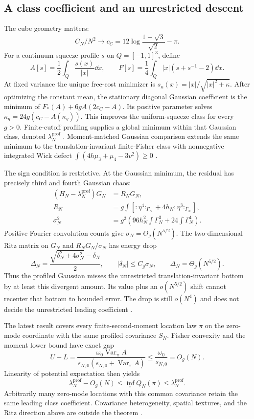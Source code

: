\subsection{A class coefficient and an unrestricted descent}
The cube geometry matters:
\[
 C_N/N^2\longrightarrow c_C=12\log\frac{1+\sqrt3}{\sqrt2}-\pi.
\]
For a continuum squeeze profile $s$ on $Q=[-1,1]^3$, define
\[
 A[s]=\frac12\int_Q\frac{s(x)}{|x|}\dd x,\qquad
 F[s]=\frac14\int_Q|x|(s+s^{-1}-2)\dd x.
\]
At fixed variance the unique free-cost minimizer is
$s_\kappa(x)=|x|/\sqrt{|x|^2+\kappa}$.
After optimizing the constant mean, the stationary diagonal Gaussian
coefficient is the minimum of $F_*(A)+6gA(2c_C-A)$.
Its positive parameter solves
$\kappa_g=24g(c_C-A(\kappa_g))$.
This improves the uniform-squeeze class for every $g>0$.
Finite-cutoff profiling supplies a global minimum within that Gaussian
class, denoted $\lambda_N^{\mathrm{prof}}$ \cite{ProfileControl}.
Moment-matched Gaussian comparison extends the same minimum to the
translation-invariant finite-Fisher class with nonnegative integrated
Wick defect $\int(4h\mu_3+\mu_4-3v^2)\ge0$
\cite{NonGaussianControl}.

The sign condition is restrictive. At the Gaussian minimum, the residual
has precisely third and fourth Gaussian chaos:
\begin{align}
 (H_N-\lambda_N^{\mathrm{prof}})G_N&=R_NG_N,\nonumber\\
 R_N&=g\int\left[:\eta^4:_{\Gamma_N}
                      +4h_N:\eta^3:_{\Gamma_N}\right],\nonumber\\
 \sigma_N^2&=g^2\left(96h_N^2\int\Gamma_N^3
                              +24\int\Gamma_N^4\right).
 \label{eq:ritz}
\end{align}
Positive Fourier convolution counts give
$\sigma_N=\Theta_g(N^{5/2})$.
The two-dimensional Ritz matrix on $G_N$ and $R_NG_N/\sigma_N$ has
energy drop
\[
 \Delta_N=\frac{\sqrt{\delta_N^2+4\sigma_N^2}-\delta_N}{2},
 \qquad |\delta_N|\le C_g\sigma_N,
 \qquad \Delta_N=\Theta_g(N^{5/2}).
\]
Thus the profiled Gaussian misses the unrestricted translation-invariant
bottom by at least this divergent amount. Its value plus an
$o(N^{5/2})$ shift cannot recenter that bottom to bounded error.
The drop is still $o(N^4)$ and does not decide the unrestricted leading
coefficient \cite{RitzControl}.

The latest result covers every finite-second-moment location law $\pi$
on the zero-mode coordinate with the same profiled covariance $S_N$.
Fisher convexity and the moment lower bound have exact gap
\[
 U-L=\frac{\omega_0\operatorname{Var}_\pi A}
 {s_{N,0}(s_{N,0}+\operatorname{Var}_\pi A)}
 \le\frac{\omega_0}{s_{N,0}}=O_g(N).
\]
Linearity of potential expectation then yields
\[
 \lambda_N^{\mathrm{prof}}-O_g(N)
 \le\inf_\pi Q_N(\pi)\le\lambda_N^{\mathrm{prof}}.
\]
Arbitrarily many zero-mode locations with this common covariance retain
the same leading class coefficient. Covariance heterogeneity, spatial
textures, and the Ritz direction above are outside the theorem
\cite{MixtureControl}.

